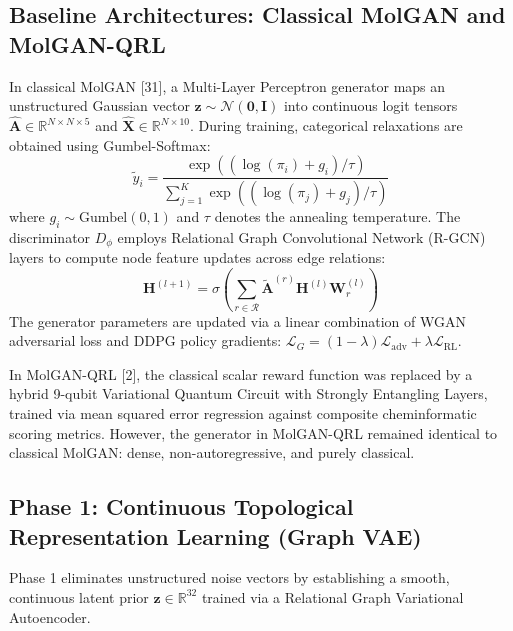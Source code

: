 \documentclass[10pt,a4paper]{article}
\begin{document}
\subsection{Baseline Architectures: Classical MolGAN and MolGAN-QRL}
In classical MolGAN [31], a Multi-Layer Perceptron generator maps an unstructured Gaussian vector $\mathbf{z} \sim \mathcal{N}(\mathbf{0}, \mathbf{I})$ into continuous logit tensors $\hat{\mathbf{A}} \in \mathbb{R}^{N \times N \times 5}$ and $\hat{\mathbf{X}} \in \mathbb{R}^{N \times 10}$. During training, categorical relaxations are obtained using Gumbel-Softmax:
\begin{equation}
\tilde{y}_i = \frac{\exp((\log(\pi_i) + g_i) / \tau)}{\sum_{j=1}^K \exp((\log(\pi_j) + g_j) / \tau)}
\end{equation}
where $g_i \sim \text{Gumbel}(0, 1)$ and $\tau$ denotes the annealing temperature. The discriminator $D_\phi$ employs Relational Graph Convolutional Network (R-GCN) layers to compute node feature updates across edge relations:
\begin{equation}
\mathbf{H}^{(l+1)} = \sigma\left( \sum_{r \in \mathcal{R}} \tilde{\mathbf{A}}^{(r)} \mathbf{H}^{(l)} \mathbf{W}_r^{(l)} \right)
\end{equation}
The generator parameters are updated via a linear combination of WGAN adversarial loss and DDPG policy gradients: $\mathcal{L}_G = (1 - \lambda)\mathcal{L}_{\text{adv}} + \lambda \mathcal{L}_{\text{RL}}$.

In MolGAN-QRL [2], the classical scalar reward function was replaced by a hybrid 9-qubit Variational Quantum Circuit with Strongly Entangling Layers, trained via mean squared error regression against composite cheminformatic scoring metrics. However, the generator in MolGAN-QRL remained identical to classical MolGAN: dense, non-autoregressive, and purely classical.

\subsection{Phase 1: Continuous Topological Representation Learning (Graph VAE)}
Phase 1 eliminates unstructured noise vectors by establishing a smooth, continuous latent prior $\mathbf{z} \in \mathbb{R}^{32}$ trained via a Relational Graph Variational Autoencoder.
\end{document}
